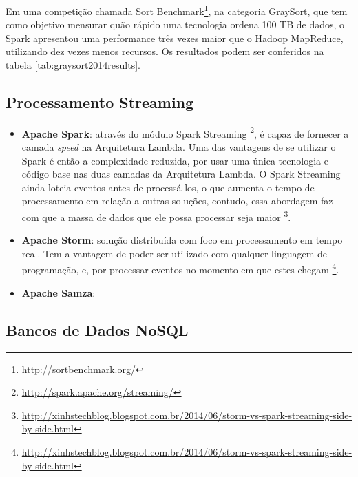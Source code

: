 Em uma competição chamada Sort
Benchmark\footnote{\url{http://sortbenchmark.org/}}, na categoria GraySort,
que tem como objetivo mensurar quão rápido uma tecnologia ordena 100 TB de
dados, o Spark apresentou uma performance três vezes maior que o Hadoop
MapReduce, utilizando dez vezes menos recursos. Os resultados podem ser
conferidos na tabela \ref{tab:graysort2014results}.

\subsection{Processamento Streaming}

\begin{itemize}
    \item \textbf{Apache Spark}: através do módulo Spark Streaming
\footnote{\url{http://spark.apache.org/streaming/}}, é capaz de fornecer a
camada \textit{speed} na Arquitetura Lambda. Uma das vantagens de se utilizar
o Spark é então a complexidade reduzida, por usar uma única tecnologia e
código base nas duas camadas da Arquitetura Lambda. O Spark Streaming ainda
loteia eventos antes de processá-los, o que aumenta o tempo de processamento
em relação a outras soluções, contudo, essa abordagem faz com que a massa de
dados que ele possa processar seja maior
\footnote{\url{http://xinhstechblog.blogspot.com.br/2014/06/storm-vs-spark-streaming-side-by-side.html}}.

    \item \textbf{Apache Storm}: solução distribuída com foco em processamento
em tempo real. Tem a vantagem de poder ser utilizado com qualquer linguagem de
programação, e, por processar eventos no momento em que estes chegam
\footnote{\url{http://xinhstechblog.blogspot.com.br/2014/06/storm-vs-spark-streaming-side-by-side.html}}.

    \item \textbf{Apache Samza}:

\end{itemize}

\subsection{Bancos de Dados NoSQL}

